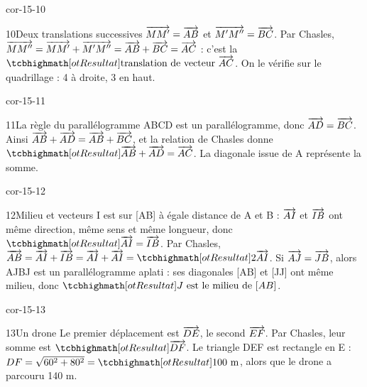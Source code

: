 \begin{blocLivre}{cor-15-10}\begin{corrige}{10}{Deux translations successives}
$\overrightarrow{MM'}=\overrightarrow{AB}$ et $\overrightarrow{M'M''}=\overrightarrow{BC}$. Par Chasles, $\overrightarrow{MM''}=\overrightarrow{MM'}+\overrightarrow{M'M''}=\overrightarrow{AB}+\overrightarrow{BC}=\overrightarrow{AC}$ : c’est la $\res{\text{translation de vecteur }\vect{AC}}$. On le vérifie sur le quadrillage : 4 à droite, 3 en haut.
\label{fig-cor-15-10}
\end{corrige}\end{blocLivre}
\begin{blocLivre}{cor-15-11}\begin{corrige}{11}{La règle du parallélogramme}
ABCD est un parallélogramme, donc $\overrightarrow{AD}=\overrightarrow{BC}$. Ainsi $\overrightarrow{AB}+\overrightarrow{AD}=\overrightarrow{AB}+\overrightarrow{BC}$, et la relation de Chasles donne $\res{\vect{AB}+\vect{AD}=\vect{AC}}$. La diagonale issue de A représente la somme.
\label{fig-cor-15-11}
\end{corrige}\end{blocLivre}
\begin{blocLivre}{cor-15-12}\begin{corrige}{12}{Milieu et vecteurs}
I est sur [AB] à égale distance de A et B : $\overrightarrow{AI}$ et $\overrightarrow{IB}$ ont même direction, même sens et même longueur, donc $\res{\vect{AI}=\vect{IB}}$. Par Chasles, $\vect{AB}=\vect{AI}+\vect{IB}=\vect{AI}+\vect{AI}=\res{2\vect{AI}}$. Si $\overrightarrow{AJ}=\overrightarrow{JB}$, alors AJBJ est un parallélogramme aplati : ses diagonales [AB] et [JJ] ont même milieu, donc $\res{J\text{ est le milieu de }[AB]}$.
\label{fig-cor-15-12}
\end{corrige}\end{blocLivre}
\begin{blocLivre}{cor-15-13}\begin{corrige}{13}{Un drone}
Le premier déplacement est $\overrightarrow{DE}$, le second $\overrightarrow{EF}$. Par Chasles, leur somme est $\res{\vect{DF}}$. Le triangle DEF est rectangle en E : $DF=\sqrt{60^2+80^2}=\res{100\text{ m}}$, alors que le drone a parcouru 140 m.
\label{fig-cor-15-13}
\end{corrige}\end{blocLivre}
